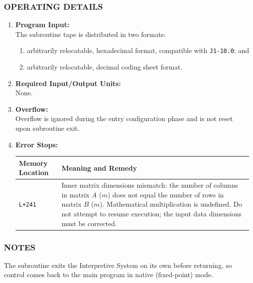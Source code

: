 \subsubsection*{OPERATING DETAILS}

\begin{enumerate}[leftmargin=1.5em, itemsep=6pt]
    \item \textbf{Program Input:} \\
    The subroutine tape is distributed in two formats:
    \begin{enumerate}[label=\alph*), itemsep=2pt, topsep=2pt]
        \item arbitrarily relocatable, hexadecimal format, compatible with \texttt{J1-10.0}; and
        \item arbitrarily relocatable, decimal coding sheet format.
    \end{enumerate}
    
    \item \textbf{Required Input/Output Units:} \\
    None.
    
    \item \textbf{Overflow:} \\
    Overflow is ignored during the entry configuration phase and is not reset upon subroutine exit.
    
    \item \textbf{Error Stops:} \\
    \begin{tabularx}{\textwidth}{lX}
        \toprule
        \textbf{Memory Location} & \textbf{Meaning and Remedy} \\
        \midrule
        \texttt{L+241}           & Inner matrix dimensions mismatch: the number of columns in matrix $A$ ($m$) does not equal the number of rows in matrix $B$ ($m$). Mathematical multiplication is undefined. Do not attempt to resume execution; the input data dimensions must be corrected. \\
        \bottomrule
    \end{tabularx}
\end{enumerate}

\subsubsection*{NOTES}
The subroutine exits the Interpretive System on its own before returning, so control comes back to the main program in native (fixed-point) mode.
\newpage


